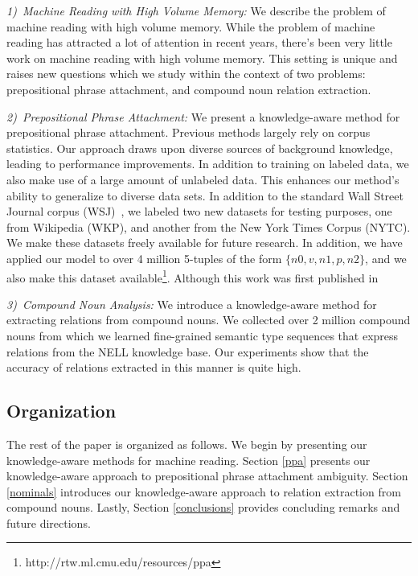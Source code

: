 \documentclass[jair,twoside,11pt,theapa]{article}
\begin{document}
\textit{1)~Machine Reading   with  High Volume  Memory:}  We describe the problem of machine reading
with high volume memory. While the problem of machine reading has attracted a lot of attention in recent years,
there's been very little work on machine reading with high volume memory. This setting is unique and raises new questions which we study within the context of two problems: prepositional phrase attachment, and compound noun relation extraction. 
 
\textit{2)~Prepositional Phrase Attachment: }  We present  a knowledge-aware method for prepositional phrase attachment.
Previous  methods largely rely on  corpus statistics. Our approach  draws upon 
 diverse sources of background knowledge, leading to performance improvements. 
In addition to training on labeled  data, we also make use of a large amount of unlabeled data. This enhances our method's ability to generalize to diverse data sets. 
In addition to the standard Wall Street Journal corpus (WSJ)~\cite{Ratnaparkhi1994}, we labeled two new datasets for testing purposes, one from Wikipedia (WKP), and another from the  New York Times Corpus (NYTC). We make  these datasets freely available for future research.  In addition, we have applied our  model to over 4 million 5-tuples of the form $\{n0, v, n1, p, n2\}$, and we also make this dataset  available\footnote{http://rtw.ml.cmu.edu/resources/ppa}.
Although this work was first published in 

\textit{3)~Compound Noun Analysis: }  We introduce a knowledge-aware method for extracting relations from compound nouns. We collected over 2 million compound nouns from which we learned fine-grained semantic type sequences that express relations from the NELL knowledge base. Our experiments show that the accuracy of relations extracted in this manner is quite high.


\subsection{Organization}
The rest of the paper is organized as follows. We begin by presenting our knowledge-aware methods for machine reading.  Section \ref{ppa} presents our knowledge-aware approach to 
prepositional phrase attachment ambiguity. Section \ref{nominals} introduces our  knowledge-aware approach to relation extraction from compound nouns. Lastly, Section \ref{conclusions} provides concluding remarks and future directions.

 




%

\end{document}
